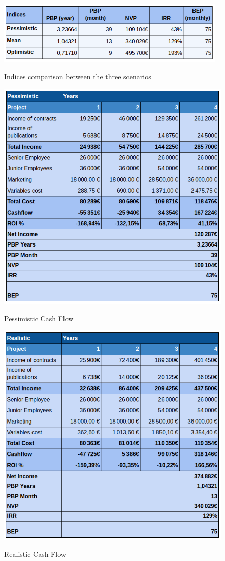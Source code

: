 \documentclass[./main.tex]{subfiles}
\begin{document}
\begin{table}[H]
	\centering
	\includegraphics[width=11cm]{indices.png}
	\caption{Indices comparison between the three scenarios}
	\label{tab:indicies}
\end{table}
\begin{table}[H]
	\centering
	\includegraphics[width=11.3cm]{pessimistic.png}
	\caption{Pessimistic Cash Flow}
	\label{tab:pessimistic}
\end{table}
\begin{table}[H]
	\centering
	\includegraphics[width=11.3cm]{realistic.png}
	\caption{Realistic Cash Flow}
	\label{tab:realistic}
\end{table}
\end{document}
